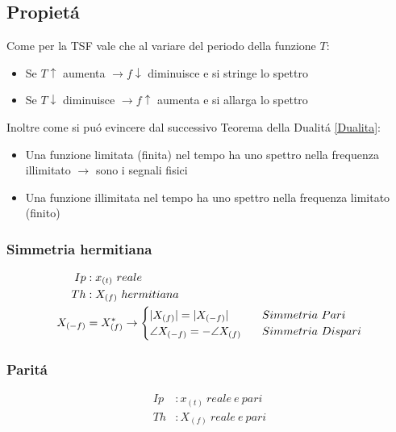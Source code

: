     \subsection{Propietá}
        Come per la TSF vale che al variare del periodo della funzione $T$:
            \begin{itemize}
                \item Se $T\uparrow$ aumenta $ \rightarrow f\downarrow$ diminuisce e si stringe lo spettro  
                \item Se $T\downarrow$ diminuisce $ \rightarrow f\uparrow$ aumenta e si allarga lo spettro  
            \end{itemize}
        Inoltre come si puó evincere dal successivo Teorema della Dualitá \ref{Dualita}:
            \begin{itemize}
                \item Una funzione limitata (finita) nel tempo ha uno spettro nella frequenza illimitato $\rightarrow$ sono i segnali fisici   
                \item Una funzione illimitata nel tempo ha uno spettro nella frequenza limitato (finito)
            \end{itemize}

        \subsubsection{Simmetria hermitiana}\label{Simmetria Hermitiana}
            \begin{align}
                Ip&: x_{(t)}\ reale \nonumber \\
                Th&: X_{(f)}\ hermitiana \nonumber \\ 
                X_{(-f)} &= X_{(f)}^{*} \rightarrow
                    \begin{cases}
                        |X_{(f)}| = |X_{(-f)}| \hspace{0.3cm} & Simmetria\ Pari \\
                        \angle X_{(-f)} = -\angle X_{(f)}\hspace{0.3cm} & Simmetria\ Dispari
                    \end{cases} \nonumber
            \end{align}

        \subsubsection{Paritá}\label{Parita}
            \begin{align}
                Ip&: x_{(t)}\ reale\ e\ pari  \nonumber \\
                Th&: X_{(f)}\ reale\ e\ pari \nonumber  
            \end{align}

